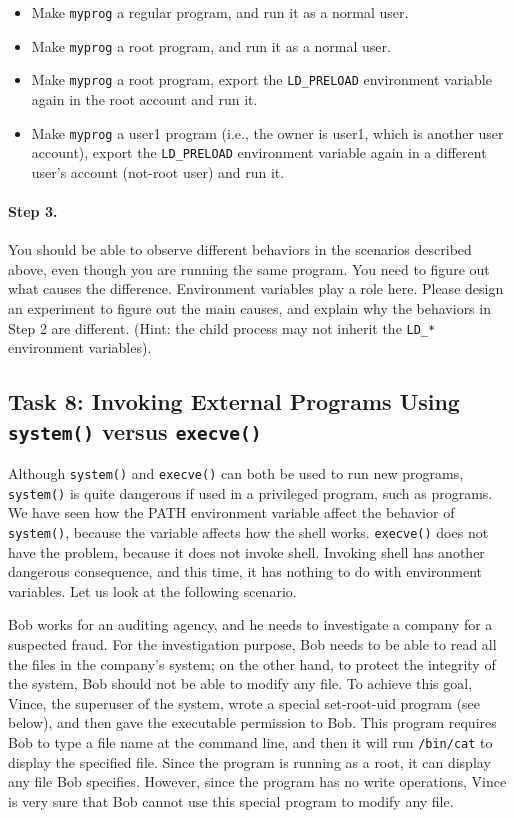   \begin{itemize}
  \item Make {\tt myprog} a regular program, and run it as a normal user.
  \item Make {\tt myprog} a \setuid root program, and run it as a normal user.
  \item Make {\tt myprog} a \setuid root program, export the {\tt LD\_PRELOAD}
  environment variable again in the root account and run it.

  \item Make {\tt myprog} a \setuid user1 program (i.e., the owner is user1, which
        is another user account), export the {\tt LD\_PRELOAD} environment variable
	again in a different user's account (not-root user) and run it.
  \end{itemize}


\paragraph{Step 3.}
You should be able to observe different behaviors in the scenarios
described above, even though you are running the same program.  You need
to figure out what causes the difference. Environment variables
play a role here. Please design an experiment to figure out the
main causes, and explain why the behaviors in Step 2 are
different. (Hint: the child process
may not inherit the {\tt LD\_*} environment variables).



\subsection{Task 8: Invoking External Programs Using {\tt system()} versus {\tt execve()}}

Although {\tt system()} and {\tt execve()} can both be used to run new
programs, {\tt system()} is quite dangerous if used in a privileged
program, such as \setuid programs. We have seen how the PATH environment
variable affect the behavior of {\tt system()}, because the variable
affects how the shell works. {\tt execve()} does not have the problem,
because it does not invoke shell. Invoking shell has another dangerous
consequence, and this time, it has nothing to do with environment
variables.  Let us look at the following scenario.


Bob works for an auditing agency, and he needs to investigate a company for a suspected
fraud. For the investigation purpose, Bob needs to be able to read
all the files in the
company's \unix system; on the other hand, to protect the integrity of the system,
Bob should not be able to modify any file.
To achieve this goal, Vince, the superuser of the system,
wrote a special set-root-uid program (see
below), and then gave the executable permission to Bob. This program requires
Bob to type a file name at the command line, and then it will
run {\tt /bin/cat} to display the specified file. Since the program is running
as a root, it can display any file Bob specifies. However, since the program
has no write operations, Vince is very sure that Bob cannot use this special program
to modify any file.

